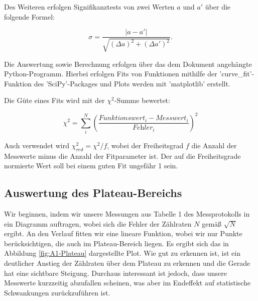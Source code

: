 \documentclass{article}
\begin{document}
Des Weiteren erfolgen Signifikanztests von zwei Werten $a$ und $a'$ über die folgende Formel:

\begin{equation}
    \sigma = \frac{|a-a'|}{\sqrt{(\Delta a)^2 + (\Delta a')^2}}.
\end{equation}

Die Auswertung sowie Berechnung erfolgen über das dem Dokument angehängte Python-Programm. Hierbei erfolgen Fits von Funktionen mithilfe der 'curve\_fit'-Funktion des 'SciPy'-Packages und Plots werden mit 'matplotlib' erstellt.

Die Güte eines Fits wird mit der $\chi^2$-Summe bewertet:

\begin{equation}
    \chi^2 = \sum_i^N \left( \frac{\textit{Funktionswert}_i - \textit{Messwert}_i}{\textit{Fehler}_i} \right)^2
\end{equation}

Auch verwendet wird $\chi^2_{red} = \chi^2 / f$, wobei der Freiheitsgrad $f$ die Anzahl der Messwerte minus die Anzahl der Fitparameter ist. Der auf die Freiheitsgrade normierte Wert soll bei einem guten Fit ungefähr 1 sein.


\newpage

\subsection{Auswertung des Plateau-Bereichs}

Wir beginnen, indem wir unsere Messungen aus Tabelle 1 des Messprotokolls in ein Diagramm auftragen, wobei sich die Fehler der Zählraten $N$ gemäß $\sqrt{N}$ ergibt. An den Verlauf fitten wir eine lineare Funktion, wobei wir nur Punkte berücksichtigen, die auch im Plateau-Bereich liegen. Es ergibt sich das in Abbildung \ref{fig:A1-Plateau} dargestellte Plot. Wie gut zu erkennen ist, ist ein deutlicher Anstieg der Zählraten über dem Plateau zu erkennen und die Gerade hat eine sichtbare Steigung. Durchaus interessant ist jedoch, dass unsere Messwerte kurzzeitig abzufallen scheinen, was aber im Endeffekt auf statistische Schwankungen zurückzuführen ist.
\end{document}
